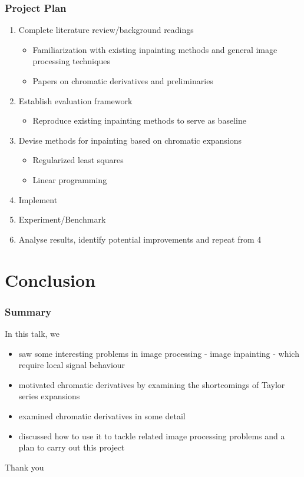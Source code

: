 \documentclass{beamer}
\begin{document}
\begin{frame}
\frametitle{Project Plan}

\begin{enumerate}
	\item Complete literature review/background readings
	\begin{itemize}
		\item Familiarization with existing inpainting methods
			and general image processing techniques
		\item Papers on chromatic derivatives and preliminaries
	\end{itemize}
	\item Establish evaluation framework
	\begin{itemize}
		\item Reproduce existing inpainting methods to serve as baseline  
	\end{itemize}
	\item Devise methods for inpainting based on chromatic expansions
	\begin{itemize}
		\item Regularized least squares 
		\item Linear programming 
	\end{itemize}
	\item Implement
	\item Experiment/Benchmark
	\item Analyse results, identify potential improvements and repeat from 4
\end{enumerate}


\end{frame}

\section{Conclusion}

\begin{frame}
\frametitle{Summary}

In this talk, we

\begin{itemize}
	\item saw some interesting problems in image processing - image inpainting 
		- which require local signal behaviour
	\item motivated chromatic derivatives by examining the shortcomings 
		of Taylor series expansions
	\item examined chromatic derivatives in some detail
	\item discussed how to use it to tackle related image processing problems
		and a plan to carry out this project
\end{itemize}

\pause

\begin{center}
\Large Thank you
\end{center}

\end{frame}
\end{document}
